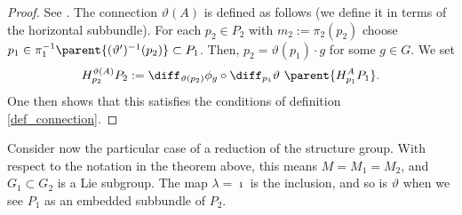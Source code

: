 \begin{proof}
    See \parencite[Chap. II, Prop. 6.1]{kobayashi_vol1}. The connection \(\vartheta(A)\) is defined as follows (we define it in terms of the horizontal subbundle). For each \(p_2 \in P_2\) with \(m_2:=\pi_2(p_2)\) choose \(p_1 \in \pi_1^{-1}\parent{(\vartheta')^{-1}(p_2)} \subset P_1\). Then, \(p_2=\vartheta(p_1) \cdot g\) for some \(g \in G\). We set
    \[
    H^{\vartheta(A)}_{p_2}P_2:=\diff_{\vartheta(p_2)} \phi_g \circ \diff_{p_1} \vartheta \ \parent{H^A_{p_1}P_1}.
    \]  
    One then shows that this satisfies the conditions of definition \ref{def_connection}.
\end{proof}

\begin{obs} \label{obs_induced_connection_homom}
    Consider now the particular case of a reduction of the structure group. With respect to the notation in the theorem above, this means \(M=M_1=M_2\), and \(G_1 \subset G_2\) is a Lie subgroup. The map \(\lambda=\imath\) is the inclusion, and so is \(\vartheta\) when we see \(P_1\) as an embedded subbundle of \(P_2\). 
\end{obs}

